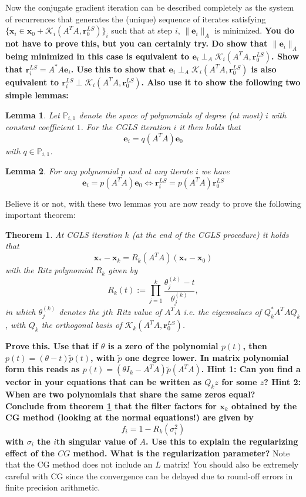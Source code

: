 \documentclass[12pt]{article}
\newtheorem{lemma}{Lemma}
\newtheorem{theorem}{Theorem}
\newcommand{\mbf}[1]{\mathbf{#1}}
\begin{document}
Now the conjugate gradient iteration can be described completely as the system of recurrences that generates the (unique) sequence of iterates satisfying $\{\mbf{x}_i\in \mathbf{x}_0 + \mathcal{K}_i(A^TA,\mathbf{r}_0^{LS})\}_i$ such that at step $i$, $\|\mbf{e}_i\|_A$ is minimized. \textbf{You do not have to prove this, but you can certainly try. Do show that $\|\mbf{e}_i\|_A$ being minimized in this case is equivalent to $\mathbf{e}_i \perp_A \mathcal{K}_i(A^TA,\mathbf{r}_0^{LS})$. Show that $\mathbf{r}_i^{LS}=A^*A\mathbf{e}_i$. Use this to show that $\mathbf{e}_i \perp_A \mathcal{K}_i(A^TA,\mathbf{r}_0^{LS})$ is also equivalent to $\mathbf{r}_i^{LS} \perp \mathcal{K}_i(A^TA,\mathbf{r}_0^{LS})$. Also use it to show the following two simple lemmas:}
\begin{lemma}
Let $\mathbb{P}_{i,1}$ denote the space of polynomials of degree (at most) $i$ with constant coefficient $1$. For the CGLS iteration $i$ it then holds that
$$\mathbf{e}_i=q(A^TA)\mathbf{e}_0$$
with $q\in\mathbb{P}_{i,1}$. 
\end{lemma}
\begin{lemma}
For any polynomial $p$ and at any iterate $i$ we have
$$\mathbf{e}_i=p(A^TA)\mathbf{e}_0 \iff \mathbf{r}_i^{LS}=p(A^TA)\mathbf{r}_0^{LS}$$
\end{lemma}
Believe it or not, with these two lemmas you are now ready to prove the following important theorem:
\begin{theorem}\label{thm:CGPoly}
At CGLS iteration $k$ (at the end of the CGLS procedure) it holds that
$$\mathbf{x}_{\ast}-\mathbf{x}_k=R_k(A^TA)(\mathbf{x}_{\ast}-\mbf{x}_0)$$
with the \emph{Ritz polynomial} $R_k$ given by
$$R_k(t):=\prod_{j=1}^{k}\frac{\theta_j^{(k)}-t}{\theta_j^{(k)}},$$
in which $\theta_j^{(k)}$ denotes the $jth$ Ritz value of $A^{T}A$ i.e. the eigenvalues of $Q_k^{\ast}A^{T}AQ_k$, with $Q_k$ the orthogonal basis of $\mathcal{K}_k(A^{T}A,\mathbf{r}_0^{LS})$.
\end{theorem}
\textbf{Prove this. Use that if $\theta$ is a zero of the polynomial $p(t)$, then $p(t)=(\theta-t)\tilde{p}(t)$, with $\tilde{p}$ one degree lower. In matrix polynomial form this reads as $p(t)=(\theta I_k-A^TA)\tilde{p}(A^TA)$. Hint 1: Can you find a vector in your equations that can be written as $Q_k z$ for some $z$? Hint 2: When are two polynomials that share the same zeros equal?\\
Conclude from theorem \ref{thm:CGPoly} that the filter factors for $\mathbf{x}_k$ obtained by the CG method (looking at the normal equations!) are given by}
$$f_i=1-R_k(\sigma_i^2)$$
\textbf{with $\sigma_i$ the $i$th singular value of $A$. Use this to explain the regularizing effect of the $CG$ method. What is the regularization parameter?}
Note that the CG method does not include an $L$ matrix! You should also be extremely careful with CG since the convergence can be delayed due to round-off errors in finite precision arithmetic.
\end{document}
